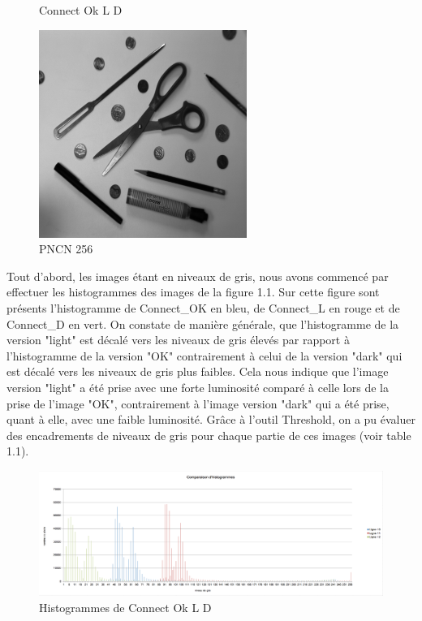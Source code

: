 \documentclass{scrreprt}
\begin{document}
\begin{center}
\begin{figure}[!h]
\caption{Connect Ok L D }
\end{figure}
\begin{figure}[!h]
\centering
\includegraphics[scale=0.6]{images/PNCN256.png}
\caption{PNCN 256}
\end{figure}
\end{center}

\newpage
Tout d'abord, les images étant en niveaux de gris, nous avons commencé par effectuer les histogrammes des images de la figure 1.1. 
Sur cette figure sont présents l'histogramme de Connect_OK en bleu, de Connect_L en rouge et de Connect_D en vert. 
On constate de manière générale, que l'histogramme de la version "light" est décalé vers les niveaux de gris élevés par rapport
à l'histogramme de la version "OK" contrairement à celui de la version "dark" qui est décalé vers les niveaux de gris plus faibles.
Cela nous indique que l'image version "light" a été prise avec une forte luminosité comparé à celle lors de la prise de l'image "OK", 
contrairement à l'image version "dark" qui a été prise, quant à elle, avec une faible luminosité.
Grâce à l'outil Threshold, on a pu évaluer des encadrements de niveaux de gris pour chaque partie de ces images (voir table 1.1).
 
\begin{figure}[!h]
\centering
\includegraphics[width=15cm]{images/histogrammes1.png}
\caption{Histogrammes de Connect Ok L D}
\end{figure}
\end{document}
